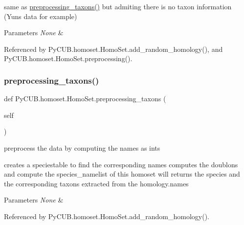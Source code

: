 same as \mbox{\hyperlink{class_py_c_u_b_1_1homoset_1_1_homo_set_aa39455620288b4912e5540491913e792}{preprocessing\+\_\+taxons()}} but admiting there is no taxon information (Yun\textquotesingle{}s data for example) 


\begin{DoxyParams}{Parameters}
{\em None} & \\
\hline
\end{DoxyParams}


Referenced by Py\+C\+U\+B.\+homoset.\+Homo\+Set.\+add\+\_\+random\+\_\+homology(), and Py\+C\+U\+B.\+homoset.\+Homo\+Set.\+preprocessing().

\mbox{\label{class_py_c_u_b_1_1homoset_1_1_homo_set_aa39455620288b4912e5540491913e792}} 
\subsubsection{\texorpdfstring{preprocessing\+\_\+taxons()}{preprocessing\_taxons()}}
{\footnotesize\ttfamily def Py\+C\+U\+B.\+homoset.\+Homo\+Set.\+preprocessing\+\_\+taxons (\begin{DoxyParamCaption}\item[{}]{self }\end{DoxyParamCaption})}



preprocess the data by computing the names as ints 

creates a speciestable to find the corresponding names computes the doublons and compute the species\+\_\+namelist of this homoset will returns the species and the corresponding taxons extracted from the homology.\+names


\begin{DoxyParams}{Parameters}
{\em None} & \\
\hline
\end{DoxyParams}


Referenced by Py\+C\+U\+B.\+homoset.\+Homo\+Set.\+add\+\_\+random\+\_\+homology().

\mbox{\label{class_py_c_u_b_1_1homoset_1_1_homo_set_af19ffd1cceb4b222e642713456b300a1}} 

